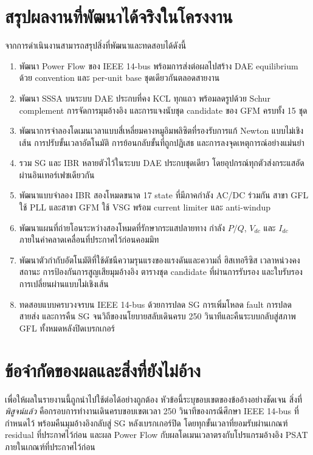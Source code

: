\documentclass[12pt,a4paper]{article}
\begin{document}
\section{สรุปผลงานที่พัฒนาได้จริงในโครงงาน}
จากการดำเนินงานสามารถสรุปสิ่งที่พัฒนาและทดสอบได้ดังนี้
\begin{enumerate}
\item พัฒนา Power Flow ของ IEEE 14-bus พร้อมการส่งต่อผลไปสร้าง DAE equilibrium ด้วย convention และ per-unit base ชุดเดียวกันตลอดสายงาน
\item พัฒนา SSSA บนระบบ DAE ประกบที่คง KCL ทุกแถว พร้อมลดรูปด้วย Schur complement การจัดการมุมอ้างอิง และการแจงนับชุด candidate ของ GFM ครบทั้ง 15 ชุด
\item พัฒนาการจำลองโดเมนเวลาแบบสี่เหลี่ยมคางหมูอิมพลิซิตที่รองรับการแก้ Newton แบบไม่เชิงเส้น การปรับขั้นเวลาอัตโนมัติ การย้อนกลับขั้นที่ถูกปฏิเสธ และการลงจุดเหตุการณ์อย่างแม่นยำ
\item รวม SG และ IBR หลายตัวไว้ในระบบ DAE ประกบชุดเดียว โดยอุปกรณ์ทุกตัวส่งกระแสอัดผ่านอินเทอร์เฟซเดียวกัน
\item พัฒนาแบบจำลอง IBR สองโหมดขนาด 17 state ที่มีภาคกำลัง AC/DC ร่วมกัน สาขา GFL ใช้ PLL และสาขา GFM ใช้ VSG พร้อม current limiter และ anti-windup
\item พัฒนาแผนที่ถ่ายโอนระหว่างสองโหมดที่รักษากระแสปลายทาง กำลัง $P/Q$, $V_{dc}$ และ $I_{dc}$ ภายในค่าคลาดเคลื่อนที่ประกาศไว้ก่อนคอมมิท
\item พัฒนาตัวกำกับอัตโนมัติที่ใช้ดัชนีความรุนแรงของแรงดันและความถี่ ฮิสเทอรีซิส เวลาหน่วงคงสถานะ การป้องกันการสูญเสียมุมอ้างอิง ตารางชุด candidate ที่ผ่านการรับรอง และใบรับรองการเปลี่ยนผ่านแบบไม่เชิงเส้น
\item ทดสอบแบบครบวงจรบน IEEE 14-bus ด้วยการปลด SG การเพิ่มโหลด fault การปลดสายส่ง และการคืน SG จนวิถีของนโยบายสลับเดินครบ 250 วินาทีและคืนระบบกลับสู่สภาพ GFL ทั้งหมดหลังปิดเบรกเกอร์
\end{enumerate}

\section{ข้อจำกัดของผลและสิ่งที่ยังไม่อ้าง}
เพื่อให้ผลในรายงานนี้ถูกนำไปใช้ต่อได้อย่างถูกต้อง หัวข้อนี้ระบุขอบเขตของข้ออ้างอย่างชัดเจน สิ่งที่ \emph{พิสูจน์แล้ว} คือกรอบการทำงานเดินครบขอบเขตเวลา 250 วินาทีของกรณีศึกษา IEEE 14-bus ที่กำหนดไว้ พร้อมคืนมุมอ้างอิงกลับสู่ SG หลังเบรกเกอร์ปิด โดยทุกขั้นเวลาที่ยอมรับผ่านเกณฑ์ residual ที่ประกาศไว้ก่อน และผล Power Flow กับผลโดเมนเวลาตรงกับโปรแกรมอ้างอิง PSAT ภายในเกณฑ์ที่ประกาศไว้ก่อน
\end{document}
